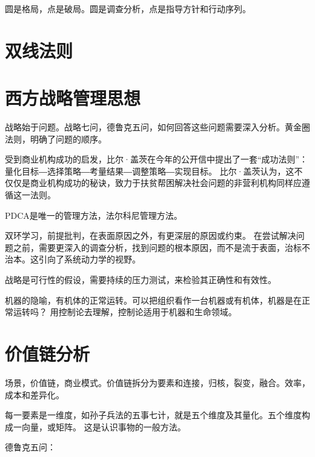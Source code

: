 圆是格局，点是破局。圆是调查分析，点是指导方针和行动序列。

\section{双线法则}

\section{西方战略管理思想}

战略始于问题。战略七问，德鲁克五问，如何回答这些问题需要深入分析。黄金圈法则，明确了问题的顺序。

受到商业机构成功的启发，比尔·盖茨在今年的公开信中提出了一套“成功法则”：量化目标―选择策略―考量结果―调整策略―实现目标。
比尔·盖茨认为，这不仅仅是商业机构成功的秘诀，致力于扶贫帮困解决社会问题的非营利机构同样应遵循这一法则。

PDCA是唯一的管理方法，法尔科尼管理方法。

双环学习，前提批判，在表面原因之外，有更深层的原因或约束。
在尝试解决问题之前，需要更深入的调查分析，找到问题的根本原因，而不是流于表面，治标不治本。这引向了系统动力学的视野。

战略是可行性的假设，需要持续的压力测试，来检验其正确性和有效性。

机器的隐喻，有机体的正常运转。可以把组织看作一台机器或有机体，机器是在正常运转吗？
用控制论去理解，控制论适用于机器和生命领域。

\section{价值链分析}

场景，价值链，商业模式。价值链拆分为要素和连接，归核，裂变，融合。效率，成本和差异化。

每一要素是一维度，如孙子兵法的五事七计，就是五个维度及其量化。五个维度构成一向量，或矩阵。
这是认识事物的一般方法。

德鲁克五问：
